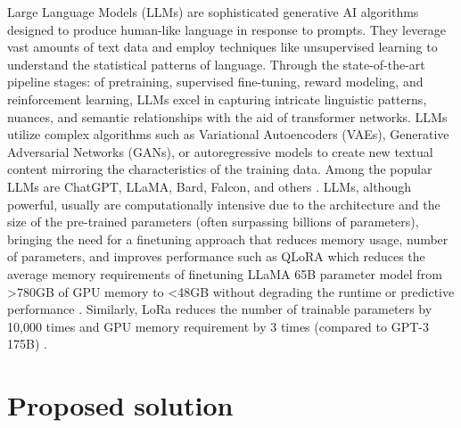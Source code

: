 \documentclass[runningheads]{llncs}
\begin{document}
Large Language Models (LLMs) are sophisticated generative AI algorithms designed to produce human-like language in response to prompts. They leverage vast amounts of text data and employ techniques like unsupervised learning to understand the statistical patterns of language. Through the state-of-the-art pipeline stages: of pretraining, supervised fine-tuning, reward modeling, and reinforcement learning, LLMs excel in capturing intricate linguistic patterns, nuances, and semantic relationships with the aid of transformer networks. LLMs utilize complex algorithms such as Variational Autoencoders (VAEs), Generative Adversarial Networks (GANs), or autoregressive models to create new textual content mirroring the characteristics of the training data. Among the popular LLMs are ChatGPT, LLaMA, Bard, Falcon, and others \cite{Hai_LLM_2023}. LLMs, although powerful, usually are computationally intensive due to the architecture and the size of the pre-trained parameters (often surpassing billions of parameters), bringing the need for a finetuning approach that reduces memory usage, number of parameters, and improves performance such as QLoRA which reduces the average memory requirements of finetuning  LLaMA 65B parameter model from >780GB of GPU memory to <48GB without degrading the runtime or predictive performance \cite{dettmers_qlora_2023}. Similarly, LoRa reduces the number of trainable parameters by 10,000 times and GPU memory requirement by 3 times (compared to GPT-3 175B) \cite{hu_lora_2021}.

\section{Proposed solution}
\label{sec:solution}
\end{document}
